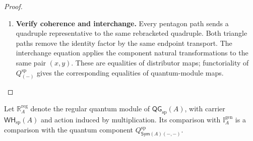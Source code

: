 \documentclass[oneside]{article}
\newcommand{\Sym}{\mathsf{Sym}}
\newcommand{\WH}{\mathsf{WH}}
\newcommand{\QG}{\mathsf{QG}}
\theoremstyle{plain}
\theoremstyle{definition}
\theoremstyle{remark}
\begin{document}
\begin{proof}
\begin{enumerate}[beginpenalty=10000]
        \item \textbf{Verify coherence and interchange.}
        Every pentagon path sends a quadruple representative to the
        same rebracketed quadruple. Both triangle paths remove the
        identity factor by the same endpoint transport. The interchange
        equation applies the component natural transformations to the
        same pair \((x,y)\). These are equalities of distributor maps;
        functoriality of \(Q_{(-)}^{\mathrm{sp}}\) gives the corresponding
        equalities of quantum-module maps. \qedhere
    \end{enumerate}
\end{proof}

Let \(\mathbb R_A^{\mathrm{reg}}\) denote the regular quantum module
of \(\QG_{\mathrm{sp}}(A)\), with carrier \(\WH_{\mathrm{sp}}(A)\) and action induced
by multiplication. Its comparison with \(\mathbb I_A^{\mathrm{gen}}\)
is a comparison with the quantum component \(Q_{\Sym(A)(-,-)}^{\mathrm{sp}}\).
\end{document}

